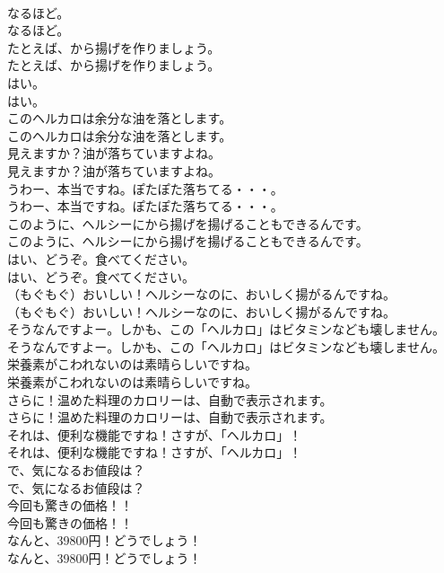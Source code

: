 \documentclass[8pt]{extreport}
\begin{document}
\begin{CJK}{UTF8}{min}
\\	なるほど。	
\\	なるほど。 
\\	たとえば、から揚げを作りましょう。	
\\	たとえば、から揚げを作りましょう。 
\\	はい。	
\\	はい。 
\\	このヘルカロは余分な油を落とします。	
\\	このヘルカロは余分な油を落とします。 
\\	見えますか？油が落ちていますよね。	
\\	見えますか？油が落ちていますよね。 
\\	うわー、本当ですね。ぽたぽた落ちてる・・・。	
\\	うわー、本当ですね。ぽたぽた落ちてる・・・。 
\\	このように、ヘルシーにから揚げを揚げることもできるんです。	
\\	このように、ヘルシーにから揚げを揚げることもできるんです。 
\\	はい、どうぞ。食べてください。	
\\	はい、どうぞ。食べてください。 
\\	（もぐもぐ）おいしい！ヘルシーなのに、おいしく揚がるんですね。	
\\	（もぐもぐ）おいしい！ヘルシーなのに、おいしく揚がるんですね。 
\\	そうなんですよー。しかも、この「ヘルカロ」はビタミンなども壊しません。	
\\	そうなんですよー。しかも、この「ヘルカロ」はビタミンなども壊しません。 
\\	栄養素がこわれないのは素晴らしいですね。	
\\	栄養素がこわれないのは素晴らしいですね。 
\\	さらに！温めた料理のカロリーは、自動で表示されます。	
\\	さらに！温めた料理のカロリーは、自動で表示されます。 
\\	それは、便利な機能ですね！さすが、「ヘルカロ」！	
\\	それは、便利な機能ですね！さすが、「ヘルカロ」！ 
\\	で、気になるお値段は？	
\\	で、気になるお値段は？ 
\\	今回も驚きの価格！！	
\\	今回も驚きの価格！！ 
\\	なんと、39800円！どうでしょう！	
\\	なんと、39800円！どうでしょう！ 

\end{CJK}
\end{document}
